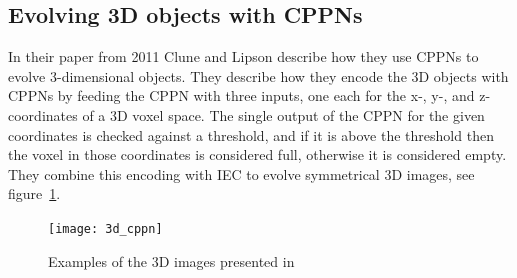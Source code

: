 \subsection{Evolving 3D objects with CPPNs}
In their paper from 2011 Clune and Lipson describe how they use CPPNs to evolve 
3-dimensional objects\cite{Clune:2011:EOG:2078245.2078246}.
They describe how they encode the 3D objects with CPPNs by feeding the CPPN 
with three inputs, one each for the x-, y-, and z-coordinates of a 3D voxel 
space.
The single output of the CPPN for the given coordinates is checked against a 
threshold, and if it is above the threshold then the voxel in those coordinates 
is considered full, otherwise it is considered 
empty\cite[p.~5]{Clune:2011:EOG:2078245.2078246}.
They combine this encoding with IEC to evolve symmetrical 3D images, see 
figure~\ref{fig:3dobjects}.
\begin{figure}[ht]
\centering
\texttt{[image: 3d\_cppn]}
\caption{Examples of the 3D images presented in 
\cite{Clune:2011:EOG:2078245.2078246}}
\label{fig:3dobjects}
\end{figure}

